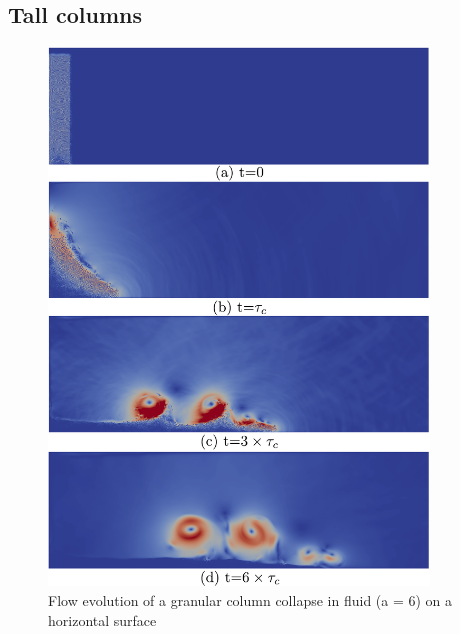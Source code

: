 \subsection{Tall columns}

\begin{figure}[htpb]
\centering
\includegraphics[width=0.9\textwidth]{LBM_DEM_a6}
\caption{Flow evolution of a granular column collapse in fluid (a = 6) on a 
horizontal surface}
\label{fig:LBM_DEM_a6}
\end{figure}


